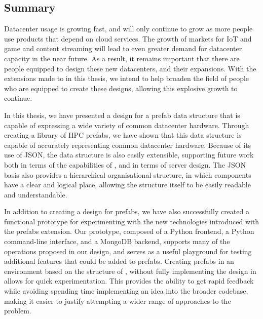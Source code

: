 \documentclass[11pt]{article}
\begin{document}
	\subsection{Summary}
		Datacenter usage is growing fast, and will only continue to grow as more people use products that depend on cloud services.
		The growth of markets for IoT and game and content streaming will lead to even greater demand for datacenter capacity in the near future.
		As a result, it remains important that there are people equipped to design these new datacenters, and their expansions.
		With the extensions made to \opendc{} in this thesis, we intend to help broaden the field of people who are equipped to create these designs, allowing this explosive growth to continue.

		In this thesis, we have presented a design for a prefab data structure that is capable of expressing a wide variety of common datacenter hardware.
		Through creating a library of HPC prefabs, we have shown that this data structure is capable of accurately representing common datacenter hardware.
		Because of its use of JSON, the data structure is also easily extensible, supporting future work both in terms of the capabilities of \opendc{}, and in terms of server design.
		The JSON basis also provides a hierarchical organisational structure, in which components have a clear and logical place, allowing the structure itself to be easily readable and understandable.
		
		In addition to creating a design for prefabs, we have also successfully created a functional prototype for experimenting with the new technologies introduced with the prefabs extension.
		Our prototype, composed of a Python frontend, a Python command-line interface, and a MongoDB backend, supports many of the operations proposed in our design, and serves as a useful playground for testing additional features that could be added to prefabs.
		Creating prefabs in an environment based on the structure of \opendc{}, without fully implementing the design in \opendc{} allows for quick experimentation.
		This provides the ability to get rapid feedback while avoiding spending time implementing an idea into the broader \opendc{} codebase, making it easier to justify attempting a wider range of approaches to the problem.
\end{document}
